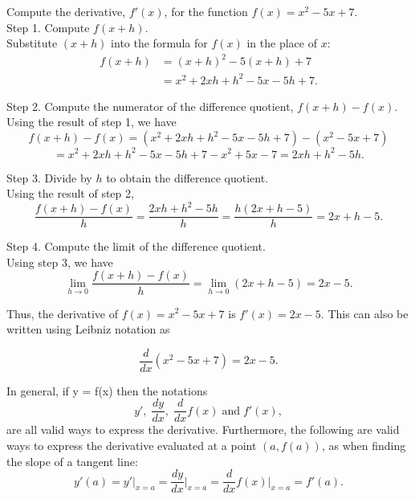 \documentclass{ximera}
\begin{document}
\begin{example}[example 2]
Compute the derivative, $f'(x)$, for the function $f(x) = x^2 - 5x + 7$.  \\
Step 1. Compute $f(x+h)$. \\
Substitute $(x+h)$ into the formula for $f(x)$ in the place of $x$:  
\begin{align*}
f(x+h) &= (x+h)^2 - 5(x+h) + 7 \\
       &= x^2 + 2xh + h^2 - 5x -5h + 7.			
\end{align*}

Step 2. Compute the numerator of the difference quotient, $f(x+h) - f(x)$.\\
Using the result of step 1, we have
\[
f(x+h) - f(x) = \left(x^2 + 2xh + h^2 - 5x -5h + 7\right) - \left(x^2 - 5x + 7\right) 
\]
\[
= x^2 + 2xh + h^2 - 5x - 5h + 7 -x^2 + 5x - 7 = 2xh + h^2 - 5h.
\]

Step 3. Divide by $h$ to obtain the difference quotient. \\
Using the result of step 2,
\[
\frac{f(x+h) - f(x)}{h}	= \frac{2xh + h^2 - 5h}{h}	= \frac{h(2x + h - 5)}{h} = 2x + h -5.
\]

Step 4. Compute the limit of the difference quotient. \\
Using step 3, we have
\[
\lim_{h \to 0} \frac{f(x+h) - f(x)}{h}	= \lim_{h \to 0} (2x + h -5) = 2x - 5.
\]

Thus, the derivative of $f(x) = x^2 - 5x + 7$ is $f'(x) = 2x -5$. This can also be written using Leibniz notation as

\[
\frac{d}{dx} \left(x^2 - 5x + 7\right) = 2x-5.
\]
\end{example}



In general, if y = f(x) then the notations
\[
y' , \; \frac{dy}{dx},\; \frac{d}{dx} f(x) \; \text{and} \; f'(x),
\]
are all valid ways to express the derivative.
Furthermore, the following are valid ways to express the derivative evaluated at a point $(a, f(a))$, as when finding the slope of a tangent line:
\[
y'(a) = y' \big|_{x=a} = \frac{dy}{dx}\Big|_{x=a} = \frac{d}{dx} f(x)\Big|_{x=a} = f'(a).
\]
\end{document}
